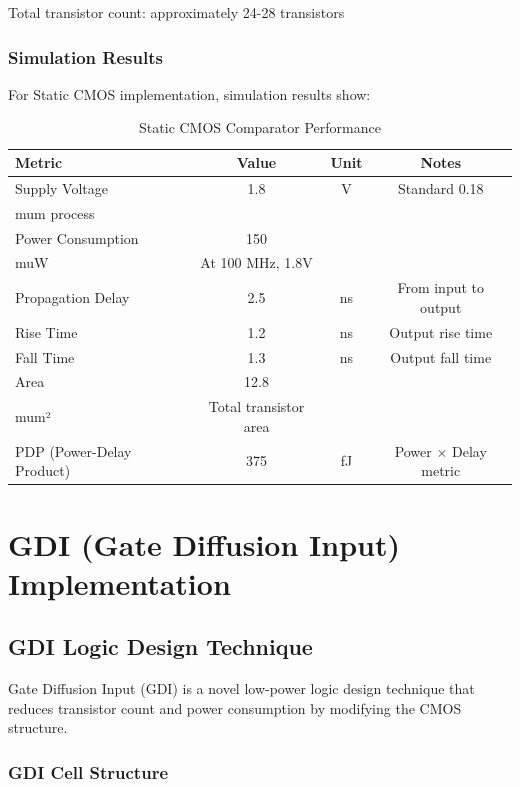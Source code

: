 \documentclass[12pt,a4paper,twoside]{report}
\begin{document}
Total transistor count: approximately 24-28 transistors

\subsection{Simulation Results}

For Static CMOS implementation, simulation results show:

\begin{table}[H]
\centering
\caption{Static CMOS Comparator Performance}
\label{tab:static_cmos_perf}
\begin{tabularx}{\textwidth}{lccc}
\toprule
Metric & Value & Unit & Notes \\
\midrule
Supply Voltage & 1.8 & V & Standard 0.18 \\mum process \\
Power Consumption & 150 & \\muW & At 100 MHz, 1.8V \\
Propagation Delay & 2.5 & ns & From input to output \\
Rise Time & 1.2 & ns & Output rise time \\
Fall Time & 1.3 & ns & Output fall time \\
Area & 12.8 & \\mum² & Total transistor area \\
PDP (Power-Delay Product) & 375 & fJ & Power × Delay metric \\
\bottomrule
\end{tabularx}
\end{table}

\chapter{GDI (Gate Diffusion Input) Implementation}
\label{ch:gdi}

\section{GDI Logic Design Technique}

Gate Diffusion Input (GDI) is a novel low-power logic design technique that reduces transistor count and power consumption by modifying the CMOS structure.

\subsection{GDI Cell Structure}
\end{document}
